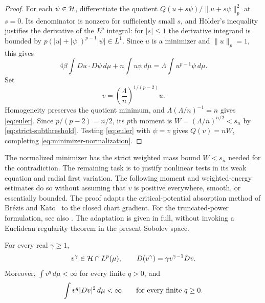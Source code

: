 \begin{proof}
For each $\psi\in\mathcal H$, differentiate the quotient
$Q(u+s\psi)/\|u+s\psi\|_p^2$ at $s=0$.  Its denominator is nonzero
for sufficiently small $s$, and H\"older's inequality justifies the
derivative of the $L^p$ integral: for $|s|\le1$ the derivative
integrand is bounded by
$p(|u|+|\psi|)^{p-1}|\psi|\in L^1$.  Since $u$ is a minimizer and
$\|u\|_p=1$, this gives
\[
 4\beta\int Du\cdot D\psi\,d\mu+n\int u\psi\,d\mu
 =\Lambda\int u^{p-1}\psi\,d\mu.
\]
Set
\[
 v=\left(\frac\Lambda n\right)^{1/(p-2)}u.
\]
Homogeneity preserves the quotient minimum, and
$\Lambda(\Lambda/n)^{-1}=n$ gives \eqref{eq:euler}.
Since $p/(p-2)=n/2$, its $p$th moment is
$W=(\Lambda/n)^{n/2}<s_n$ by
\eqref{eq:strict-subthreshold}.  Testing \eqref{eq:euler} with
$\psi=v$ gives $Q(v)=nW$, completing
\eqref{eq:minimizer-normalization}.
\end{proof}

The normalized minimizer has the strict weighted mass bound $W<s_n$
needed for the contradiction. The remaining task is to justify nonlinear
tests in its weak equation and radial first variation. The following
moment and weighted-energy estimates do so without assuming that $v$
is positive everywhere, smooth, or essentially bounded.
The proof adapts the critical-potential absorption method of
Br\'ezis and Kato~\cite{BrezisKato1979} to the closed chart gradient.
For the truncated-power formulation, see also \cite[Lemma~6, p.~178]{Brezis1986}.
The adaptation is given in full, without invoking a Euclidean regularity
theorem in the present Sobolev space.

\begin{lemma}
\label{lem:powers}
For every real $\gamma\ge1$,
\[
 v^\gamma\in\mathcal H\cap L^p(\mu),\qquad
 D(v^\gamma)=\gamma v^{\gamma-1}Dv.
\]
Moreover, $\int v^q\,d\mu<\infty$ for every finite $q>0$, and
\begin{equation}
 \int v^q|Dv|^2\,d\mu<\infty
 \qquad\hbox{for every finite }q\ge0.
 \label{eq:polynomial-weighted-energy}
\end{equation}
\end{lemma}

